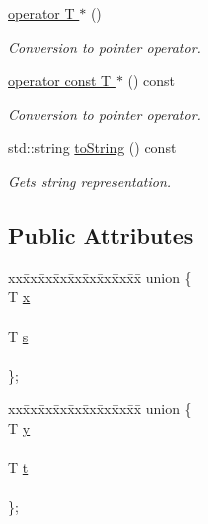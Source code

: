 \begin{DoxyCompactItemize}
\hyperlink{class_vector2_a47ef81d7cef209446129a056b0d20099}{operator T $\ast$} ()
\begin{DoxyCompactList}\small\item\em Conversion to pointer operator. \item\end{DoxyCompactList}\item 
\hyperlink{class_vector2_a8da0db93360db67497ee7614e1152a4f}{operator const T $\ast$} () const 
\begin{DoxyCompactList}\small\item\em Conversion to pointer operator. \item\end{DoxyCompactList}\item 
std::string \hyperlink{class_vector2_a4c82882017e78c4d36aa1584b8c4aa69}{toString} () const 
\begin{DoxyCompactList}\small\item\em Gets string representation. \item\end{DoxyCompactList}\end{DoxyCompactItemize}
\subsection*{Public Attributes}
\begin{DoxyCompactItemize}
\item 
\begin{tabbing}
xx\=xx\=xx\=xx\=xx\=xx\=xx\=xx\=xx\=\kill
union \{\\
\>T \hyperlink{class_vector2_a78fa1f2ed5e261c7fbeb8f3536a1ee34}{x}\\
\>\\
\>T \hyperlink{class_vector2_a4855e78bb8bc73048d7871e414047ecc}{s}\\
\>\\
\}; \\

\end{tabbing}\item 
\begin{tabbing}
xx\=xx\=xx\=xx\=xx\=xx\=xx\=xx\=xx\=\kill
union \{\\
\>T \hyperlink{class_vector2_a6cfed8355591aa269f4dba43bd806ef9}{y}\\
\>\\
\>T \hyperlink{class_vector2_afdb6c2a84434bb86bd5e8a92a546c91a}{t}\\
\>\\
\}; \\

\end{tabbing}\end{DoxyCompactItemize}
